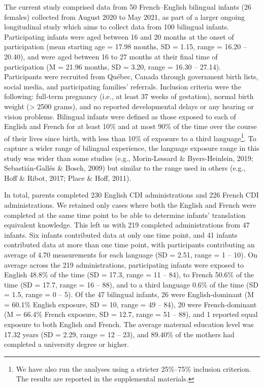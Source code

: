 \documentclass[
  ,man,floatsintext]{apa6}
\begin{document}
The current study comprised data from 50 French--English bilingual infants (26 females) collected from August 2020 to May 2021, as part of a larger ongoing longitudinal study which aims to collect data from 100 bilingual infants. Participating infants were aged between 16 and 20 months at the onset of participation (mean starting age = 17.98 months, SD = 1.15, range = 16.20 -- 20.40), and were aged between 16 to 27 months at their final time of participation (M = 21.96 months, SD = 3.20, range = 16.30 -- 27.14). Participants were recruited from Québec, Canada through government birth lists, social media, and participating families' referrals. Inclusion criteria were the following: full-term pregnancy (i.e., at least 37 weeks of gestation), normal birth weight (\textgreater{} 2500 grams), and no reported developmental delays or any hearing or vision problems. Bilingual infants were defined as those exposed to each of English and French for at least 10\% and at most 90\% of the time over the course of their lives since birth, with less than 10\% of exposure to a third language\footnote{We have also run the analyses using a stricter 25\%--75\% inclusion criterion. The results are reported in the supplemental materials.}. To capture a wider range of bilingual experience, the language exposure range in this study was wider than some studies (e.g., Morin-Lessard \& Byers-Heinlein, 2019; Sebastián-Gallés \& Bosch, 2009) but similar to the range used in others (e.g., Hoff \& Ribot, 2017; Place \& Hoff, 2011).

In total, parents completed 230 English CDI administrations and 226 French CDI administrations. We retained only cases where both the English and French were completed at the same time point to be able to determine infants' translation equivalent knowledge. This left us with 219 completed administrations from 47 infants. Six infants contributed data at only one time point, and 41 infants contributed data at more than one time point, with participants contributing an average of 4.70 measurements for each language (SD = 2.51, range = 1 -- 10). On average across the 219 administrations, participating infants were exposed to English 48.8\% of the time (SD = 17.3, range = 11 -- 84), to French 50.6\% of the time (SD = 17.7, range = 16 -- 88), and to a third language 0.6\% of the time (SD = 1.5, range = 0 -- 5). Of the 47 bilingual infants, 26 were English-dominant (M = 60.1\% English exposure, SD = 10, range = 49 -- 84), 20 were French-dominant (M = 66.4\% French exposure, SD = 12.7, range = 51 -- 88), and 1 reported equal exposure to both English and French. The average maternal education level was 17.32 years (SD = 2.29, range = 12 -- 23), and 89.40\% of the mothers had completed a university degree or higher.
\end{document}
